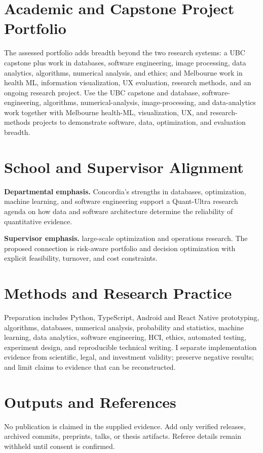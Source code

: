 \documentclass[11pt]{article}
\begin{document}
\section*{Academic and Capstone Project Portfolio}
The assessed portfolio adds breadth beyond the two research systems: a UBC capstone plus work in databases, software engineering, image processing, data analytics, algorithms, numerical analysis, and ethics; and Melbourne work in health ML, information visualization, UX evaluation, research methods, and an ongoing research project. Use the UBC capstone and database, software-engineering, algorithms, numerical-analysis, image-processing, and data-analytics work together with Melbourne health-ML, visualization, UX, and research-methods projects to demonstrate software, data, optimization, and evaluation breadth.

\section*{School and Supervisor Alignment}
\textbf{Departmental emphasis.} Concordia's strengths in databases, optimization, machine learning, and software engineering support a Quant-Ultra research agenda on how data and software architecture determine the reliability of quantitative evidence.

\textbf{Supervisor emphasis.} large-scale optimization and operations research. The proposed connection is risk-aware portfolio and decision optimization with explicit feasibility, turnover, and cost constraints.

\section*{Methods and Research Practice}
Preparation includes Python, TypeScript, Android and React Native prototyping, algorithms, databases, numerical analysis, probability and statistics, machine learning, data analytics, software engineering, HCI, ethics, automated testing, experiment design, and reproducible technical writing. I separate implementation evidence from scientific, legal, and investment validity; preserve negative results; and limit claims to evidence that can be reconstructed.

\section*{Outputs and References}
No publication is claimed in the supplied evidence. Add only verified releases, archived commits, preprints, talks, or thesis artifacts. Referee details remain withheld until consent is confirmed.
\end{document}
